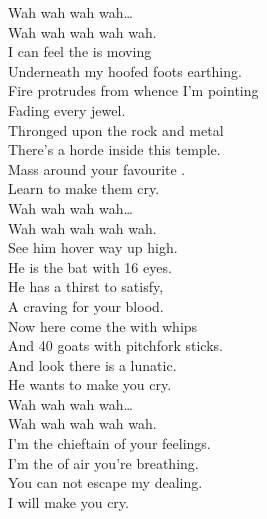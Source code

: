 


Wah wah wah wah… \\
Wah wah wah wah wah. \\

I can feel the  is moving \\
Underneath my hoofed foots earthing. \\
Fire protrudes from whence I'm pointing \\
Fading every jewel. \\

Thronged upon the rock and metal \\
There's a horde inside this temple. \\
Mass around your favourite . \\
Learn to make them cry. \\

Wah wah wah wah… \\
Wah wah wah wah wah. \\

See him hover way up high. \\
He is the bat with 16 eyes. \\
He has a thirst to satisfy, \\
A craving for your blood. \\

Now here come the  with whips \\
And 40 goats with pitchfork sticks. \\
And look there is a lunatic. \\
He wants to make you cry. \\

Wah wah wah wah… \\
Wah wah wah wah wah. \\

I'm the chieftain of your feelings. \\
I'm the  of air you're breathing. \\
You can not escape my dealing. \\
I will make you cry. \\



